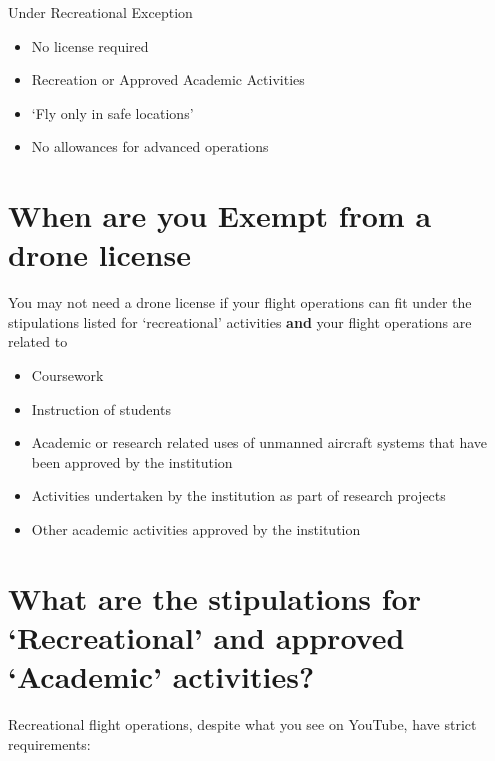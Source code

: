\documentclass[
]{book}
\providecommand{\tightlist}{%
  \setlength{\itemsep}{0pt}\setlength{\parskip}{0pt}}
\begin{document}
Under Recreational Exception

\begin{itemize}
\tightlist
\item
  No license required
\item
  Recreation or Approved Academic Activities
\item
  `Fly only in safe locations'
\item
  No allowances for advanced operations
\end{itemize}

\hypertarget{when-are-you-exempt-from-a-drone-license}{%
\section{When are you Exempt from a drone license}\label{when-are-you-exempt-from-a-drone-license}}

You may not need a drone license if your flight operations can fit under the stipulations listed for `recreational' activities \textbf{and} your flight operations are related to

\begin{itemize}
\tightlist
\item
  Coursework
\item
  Instruction of students
\item
  Academic or research related uses of unmanned aircraft systems that have been approved by the institution
\item
  Activities undertaken by the institution as part of research projects
\item
  Other academic activities approved by the institution
\end{itemize}

\hypertarget{what-are-the-stipulations-for-recreational-and-approved-academic-activities}{%
\section{What are the stipulations for `Recreational' and approved `Academic' activities?}\label{what-are-the-stipulations-for-recreational-and-approved-academic-activities}}

Recreational flight operations, despite what you see on YouTube, have strict requirements:
\end{document}
